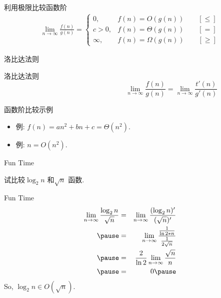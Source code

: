 \documentclass[fontset=fandol,UTF8,12pt,aspectratio=169,fleqn]{beamer}
\begin{document}
\begin{frame}{利用极限比较函数阶}
\begin{eqnarray*}
  \lim_{n\to \infty}\frac{f(n)}{g(n)}=\left\{
    \begin{array}{ll}
      0, &  f(n) = O(g(n)) \qquad [\leq]\\
c>0, &  f(n) = \Theta(g(n)) \qquad [=]\\
\infty, & f(n) = \Omega(g(n))\qquad [\geq]
    \end{array}
\right.
\end{eqnarray*}
\end{frame}

\begin{frame}{洛比达法则}
  \begin{exampleblock}{洛比达法则}
      \begin{equation*}
\hspace{5cm}      \lim_{n\to \infty}\frac{f(n)}{g(n)} = \lim_{n\to \infty}\frac{t'(n)}{g'(n)}
\end{equation*}
\end{exampleblock}
\end{frame}

\begin{frame}{函数阶比较示例}
\begin{itemize}[<+-|alert@+>]
\item 例:  $f(n)=an^2+bn+c=\Theta(n^2)$. 
\item 例:  $n=O(n^2)$.  
\end{itemize}
\end{frame}


\begin{frame}{Fun Time}
  \begin{exampleblock}{}
    试比较$\log_2 n$ 和$\sqrt{n}$ 函数.
  \end{exampleblock}
\end{frame}

\begin{frame}{Fun Time}
\begin{eqnarray*}
  \lim_{n\to \infty}\frac{\log_2n}{\sqrt n} & = &   \lim_{n\to
    \infty}\frac{(\log_2 n)'}{(\sqrt n)'}   \\ \pause
& = &   \lim_{n\to \infty}\frac{\frac{1}{\ln2* n}}{\frac{1}{2\sqrt n}}
  \\ \pause
& = & \frac{2}{\ln 2}  \lim_{n\to \infty}\frac{\sqrt n}{n}    \\ \pause
& = & 0   \pause
\end{eqnarray*}
So, $\log_2 n \in O(\sqrt n)$.   \pause
\end{frame}
\end{document}

